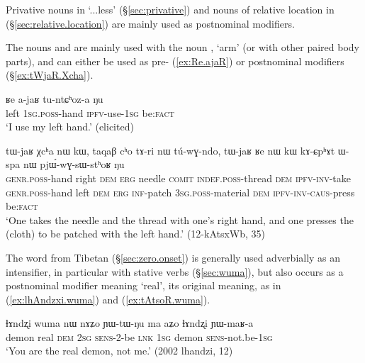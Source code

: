 Privative nouns in  `...less' (§\ref{sec:privative}) and nouns of relative location in  (§\ref{sec:relative.location}) are mainly used as postnominal modifiers.

The nouns  and  are mainly used with the noun , `arm' (or with other paired body parts), and can either be used as pre- (\ref{ex:Re.ajaR}) or postnominal modifiers (§\ref{ex:tWjaR.Xcha}).

\begin{exe}
\ex \label{ex:Re.ajaR}
\gll ʁe a-jaʁ tu-ntɕʰoz-a ŋu \\
left \textsc{1sg}.\textsc{poss}-hand \textsc{ipfv}-use-\textsc{1sg} be:\textsc{fact} \\
\glt `I use my left hand.' (elicited)
\end{exe}


\begin{exe}
\ex \label{ex:tWjaR.Xcha}
\gll tɯ-jaʁ χcʰa nɯ kɯ, taqaβ cʰo tɤ-ri nɯ tú-wɣ-ndo, tɯ-jaʁ ʁe nɯ kɯ kɤ-ɕpʰɤt ɯ-spa nɯ pjɯ́-wɣ-sɯ-stʰoʁ ŋu \\
\textsc{genr}.\textsc{poss}-hand right \textsc{dem} \textsc{erg} needle \textsc{comit}  \textsc{indef}.\textsc{poss}-thread \textsc{dem} \textsc{ipfv}-\textsc{inv}-take \textsc{genr}.\textsc{poss}-hand left \textsc{dem} \textsc{erg} \textsc{inf}-patch \textsc{3sg}.\textsc{poss}-material \textsc{dem} \textsc{ipfv}-\textsc{inv}-\textsc{caus}-press be:\textsc{fact} \\
\glt `One takes the needle and the thread with one's right hand, and one presses the (cloth) to be patched with the left hand.' (12-kAtsxWb, 35)
\end{exe}


The word  from Tibetan  (§\ref{sec:zero.onset}) is generally used adverbially as an intensifier, in particular with stative verbs (§\ref{sec:wuma}), but also occurs as a postnominal modifier meaning `real', its original meaning, as in (\ref{ex:lhAndzxi.wuma}) and (\ref{ex:tAtsoR.wuma}).

\begin{exe}
\ex \label{ex:lhAndzxi.wuma}
\gll ɬɤndʐi wuma nɯ nɤʑo ɲɯ-tɯ-ŋu ma aʑo ɬɤndʐi ɲɯ-maʁ-a \\
demon real \textsc{dem} \textsc{2sg} \textsc{sens}-2-be \textsc{lnk} \textsc{1sg} demon \textsc{sens}-not.be-\textsc{1sg} \\
\glt `You are the real demon, not me.' (2002 lhandzi, 12)
\end{exe}


